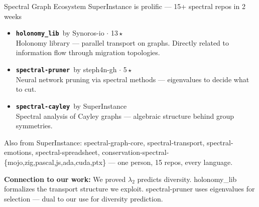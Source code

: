\documentclass[aspectratio=169,14pt]{beamer}
\newcommand{\repo}[2]{\texttt{\color{geccoAccent}\bfseries #1}{\color{dimGray}\scriptsize\ by #2}}
\newcommand{\repoGR}[2]{\texttt{\color{geccoGreen}\bfseries #1}{\color{dimGray}\scriptsize\ by #2}}
\newcommand{\connection}[1]{%
  \vspace{4pt}
  {\small\color{geccoHighlight}\textbf{Connection to our work:} \color{white}#1}}
\begin{document}
\begin{frame}{Spectral Graph Ecosystem}
  {\small\color{dimGray} SuperInstance is prolific --- 15+ spectral repos in 2 weeks}
  \vspace{6pt}

  \begin{itemize}
    \item[] \repo{holonomy\_lib}{Synoros-io} {\small$\cdot$ 13\,\(\star\)}\\
      {\small Holonomy library --- parallel transport on graphs. Directly related to information flow through migration topologies.}
    \vspace{4pt}
    \item[] \repo{spectral-pruner}{steph4n-gh} {\small$\cdot$ 5\,\(\star\)}\\
      {\small Neural network pruning via spectral methods --- eigenvalues to decide what to cut.}
    \vspace{4pt}
    \item[] \repoGR{spectral-cayley}{SuperInstance}\\
      {\small Spectral analysis of Cayley graphs --- algebraic structure behind group symmetries.}
  \end{itemize}

  \vspace{2pt}
  {\scriptsize\color{dimGray} Also from SuperInstance: spectral-graph-core, spectral-transport, spectral-emotions, spectral-spreadsheet, conservation-spectral-\{mojo,zig,pascal,js,ada,cuda,ptx\} --- one person, 15 repos, every language.}

  \vspace{4pt}
  \connection{We proved $\lambda_2$ predicts diversity. holonomy\_lib formalizes the transport structure we exploit. spectral-pruner uses eigenvalues for selection --- dual to our use for diversity prediction.}
\end{frame}
\end{document}
